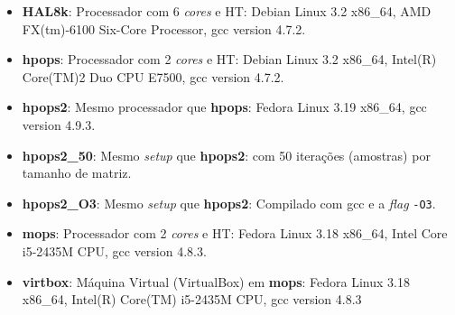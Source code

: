 \begin{itemize}
\item \textbf{HAL8k}: 
Processador com 6 \textit{cores} e HT: Debian Linux 3.2 x86\_64, AMD 
FX(tm)-6100 Six-Core Processor, gcc version 4.7.2.
\item \textbf{hpops}: 
Processador com 2 \textit{cores} e HT: Debian Linux 3.2 x86\_64, 
Intel(R) Core(TM)2 Duo CPU E7500, gcc version 4.7.2.
\item \textbf{hpops2}: 
Mesmo processador que \textbf{hpops}: Fedora 
Linux 3.19 x86\_64, gcc version 4.9.3.
\item \textbf{hpops2\_50}: 
Mesmo \textit{setup} que \textbf{hpops2}: com 50 iterações (amostras) por 
tamanho de matriz.
\item \textbf{hpops2\_O3}: 
Mesmo \textit{setup} que \textbf{hpops2}: Compilado 
com gcc e a \textit{flag} \texttt{-O3}.
\item \textbf{mops}: 
Processador com 2 \textit{cores} e HT: Fedora Linux 3.18 x86\_64, 
Intel Core i5-2435M CPU, gcc version 4.8.3.
\item \textbf{virtbox}: 
Máquina Virtual (VirtualBox) em \textbf{mops}:
Fedora Linux 3.18 x86\_64, Intel(R) Core(TM) i5-2435M CPU, gcc version 4.8.3
\end{itemize}
